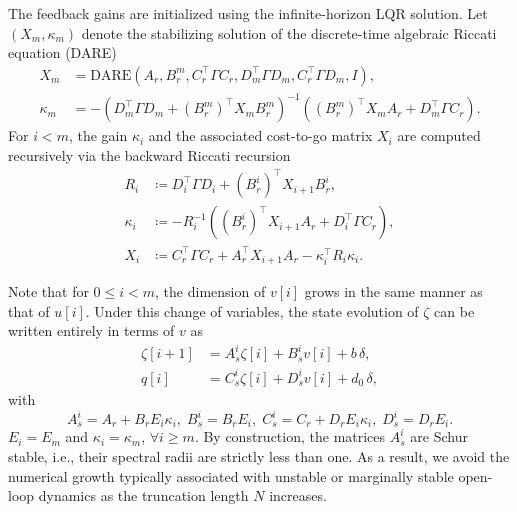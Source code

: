 The feedback gains are initialized using the infinite-horizon LQR solution. Let $(X_m,\kappa_m)$ denote the stabilizing solution of the discrete-time algebraic Riccati equation (DARE)
\begin{align*}
    X_m &= \mathrm{DARE}\!\left(A_r, B_r^m, C_r^\top \Gamma C_r, D_m^\top \Gamma D_m, C_r^\top \Gamma D_m, I\right), \\
    \kappa_m &=
    -\!\left(D_m^\top \Gamma D_m + (B_r^m)^\top X_m B_r^m\right)^{-1}
    \left((B_r^m)^\top X_m A_r + D_m^\top \Gamma C_r\right).
\end{align*}
For $i<m$, the gain $\kappa_i$ and the associated cost-to-go matrix $X_i$ are computed recursively via the backward Riccati recursion
\begin{equation}
\begin{aligned}
    R_i &\coloneqq D_i^\top \Gamma D_i + (B_r^i)^\top X_{i+1} B_r^i, \\
    \kappa_i &\coloneqq -R_i^{-1}\!\left((B_r^i)^\top X_{i+1} A_r + D_i^\top \Gamma C_r\right), \\
    X_i &\coloneqq C_r^\top \Gamma C_r + A_r^\top X_{i+1} A_r - \kappa_i^\top R_i \kappa_i .
\end{aligned}
\end{equation}

Note that for $0 \le i < m$, the dimension of $v[i]$ grows in the same manner as that of $u[i]$. Under this change of variables, the state evolution of $\zeta$ can be written entirely in terms of $v$ as
\begin{equation}\label{eqn::ss::redshift}
\begin{aligned}
\zeta[i+1] &= A_s^i \zeta[i] + B_s^i v[i] + b\,\delta, \\
q[i] &= C_s^i \zeta[i] + D_s^i v[i] + d_0\,\delta ,
\end{aligned}
\end{equation}
with
\[
A_s^i = A_r + B_r E_i \kappa_i,\;
B_s^i = B_r E_i,\;
C_s^i = C_r + D_r E_i \kappa_i,\;
D_s^i = D_r E_i .
\]
\(E_i = E_m\) and \(\kappa_i = \kappa_m\), \(\forall i\geq m\). By construction, the matrices $A_s^i$ are Schur stable, i.e., their spectral radii are strictly less than one. As a result, we avoid the numerical growth typically associated with unstable or marginally stable open-loop dynamics as the truncation length $N$ increases.

